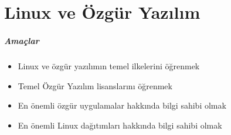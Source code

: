 \chapter{Linux ve Özgür Yazılım}
\label{chap:bolum2}
\paragraph{Amaçlar}{
\begin{itemize}
 \item Linux ve özgür yazılımın temel ilkelerini öğrenmek
 \item Temel Özgür Yazılım lisanslarını öğrenmek
 \item En önemli özgür uygulamalar hakkında bilgi sahibi olmak
 \item En önemli Linux dağıtımları hakkında bilgi sahibi olmak
 \end{itemize}}
 
